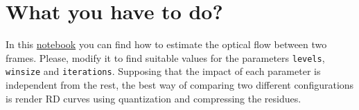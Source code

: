 \begin{comment}
The optical flow~\cite{horn1981determining} tries to establish connections between the pixels of
the frames $P$ and $R$ supposing that:
\begin{enumerate}
\item $P$ and $R$ are adjacent in time (if $R$ was taken at time $t$,
  $P$ is taken at time $dt+t$) and therefore, similar in
  content.
\item Similarity between images implies that the pixels in both
  frames, $R$ and $P$, will have the same luminance. If $I(x,y,t)$
  measures the luminance of the pixel $(x,y)$ of the frame $R$,
  similarity can be modeled by
  \begin{equation}
    I(x+dx, y+dy, t+dt) = I(x,y,t),
    \label{eq:similarity}
  \end{equation}
  where $I(x+dx, y+dy, t+dt)$ is the corresponding pixel in the frame
  $P$. The first part of the Eq.~\ref{eq:similarity} can be also
  computed by (using the first-order Taylor expansion) as
  \begin{equation}
    I(x+dx, y+dy, t+dt) = I(x,y,t) + \frac{\partial I}{\partial x}dx + \frac{\partial I}{\partial y}dy + \frac{\partial I}{\partial t}dt,
    \label{eq:taylor_exp}
  \end{equation}
  andtherefore, it must be true that
  \begin{equation}
    \frac{\partial I}{\partial x}dx + \frac{\partial I}{\partial y}dy + \frac{\partial I}{\partial t}dt = 0.
    \label{eq:constraint}
  \end{equation}
  Dividing by $dt$, we finally get that
  \begin{equation}
    \frac{\partial I}{\partial x}\frac{dx}{dt} + \frac{\partial I}{\partial y}\frac{dy}{dt} + \frac{\partial I}{\partial t} = 0.
  \end{equation}
\item Adjacent pixels follow parallel
  trajectories~\cite{horn1981determining}, with basically means that
  neighbor pixels will have similar motion.
\end{enumerate}
\end{comment}

\section{What you have to do?}

In this
\href{https://github.com/Sistemas-Multimedia/Sistemas-Multimedia.github.io/blob/master/study_guide/10-ME/optical_flow.ipynb}{notebook}
you can find how to estimate the optical flow between two
frames. Please, modify it to find suitable values for the parameters
\texttt{levels}, \texttt{winsize} and \texttt{iterations}. Supposing
that the impact of each parameter is independent from the rest, the
best way of comparing two different configurations is render RD curves
using quantization and compressing the residues.

